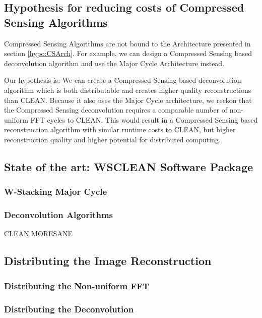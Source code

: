 \subsection{Hypothesis for reducing costs of Compressed Sensing Algorithms}
Compressed Sensing Algorithms are not bound to the Architecture presented in section \ref{hypo:CSArch}. For example, we can design a Compressed Sensing based deconvolution algorithm and use the Major Cycle Architecture instead. 

Our hypothesis is: We can create a Compressed Sensing based deconvolution algorithm which is both distributable and creates higher quality reconstructions than CLEAN. Because it also uses the Major Cycle architecture, we reckon that the Compressed Sensing deconvolution requires a comparable number of non-uniform FFT cycles to CLEAN. This would result in a Compressed Sensing based reconstruction algorithm with similar runtime costs to CLEAN, but higher reconstruction quality and higher potential for distributed computing.



\subsection{State of the art: WSCLEAN Software Package}


\subsubsection{W-Stacking Major Cycle}

\subsubsection{Deconvolution Algorithms}
CLEAN
MORESANE



\subsection{Distributing the Image Reconstruction}
\subsubsection{Distributing the Non-uniform FFT}


\subsubsection{Distributing the Deconvolution}

